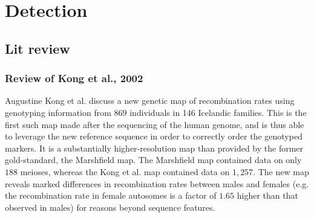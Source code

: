 \chapter{Detection}
\label{ch:detection}

\section{Lit review}
\subsection{Review of Kong et al., 2002}

Augustine Kong et al. discuss a new genetic map of recombination rates using genotyping information from $869$ individuals in 146 Icelandic families.  This is the first such map made after the sequencing of the human genome, and is thus able to leverage the new reference sequence in order to correctly order the genotyped markers.  It is a substantially higher-resolution map than provided by the former gold-standard, the Marshfield map.  The Marshfield map contained data on only $188$ meioses, whereas the Kong et al. map contained data on $1,257$.  The new map reveals marked differences in recombination rates between males and females (e.g. the recombination rate in female autosomes is a factor of $1.65$ higher than that observed in males) for reasons beyond sequence features.

